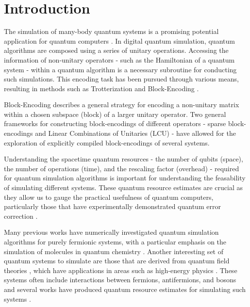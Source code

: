 \section{Introduction}
\label{sec:intro}

The simulation of many-body quantum systems is a promising potential application for quantum computers \cite{feynman2018simulating}.
In digital quantum simulation, quantum algorithms are composed using a series of unitary operations.
Accessing the information of non-unitary operators - such as the Hamiltonian of a quantum system - within a quantum algorithm is a necessary subroutine for conducting such simulations.
This encoding task has been pursued through various means, resulting in methods such as Trotterization \cite{suzuki1976generalized,hatano2005finding,lie1893theorie,trotter1959product,childs2021theory} and Block-Encoding \cite{lin2022lecture, poulin2018quantum, low2019hamiltonian}.

Block-Encoding describes a general strategy for encoding a non-unitary matrix within a chosen subspace (block) of a larger unitary operator.
Two general frameworks for constructing block-encodings of different operators - sparse block-encodings \cite{berry2009black, childs2009universal, lin2022lecture} and Linear Combinations of Unitaries (LCU) \cite{childs2012hamiltonian} - have allowed for the exploration of explicitly compiled block-encodings of several systems.

Understanding the spacetime quantum resources - the number of qubits (space), the number of operations (time), and the rescaling factor (overhead) - required for quantum simulation algorithms is important for understanding the feasability of simulating different systems.
These quantum resource estimates are crucial as they allow us to gauge the practical usefulness of quantum computers, particularly those that have experimentally demonstrated quantum error correction \cite{bluvstein2024logical, acharya2024quantum}.

Many previous works have numerically investigated quantum simulation algorithms for purely fermionic systems, with a particular emphasis on the simulation of molecules in quantum chemistry \cite{aspuru2005simulated, peruzzo2014variational, babbush2014adiabatic, o2016scalable, babbush2018encoding, google2020hartree, lee2021even, kivlichan2020improved, campbell2021early}.
Another interesting set of quantum systems to simulate are those that are derived from quantum field theories \cite{Peskin:1995ev, jordan2012quantum} , which have applications in areas such as high-energy physics \cite{bauer2023quantum}.
These systems often include interactions between fermions, antifermions, and bosons and several works have produced quantum resource estimates for simulating such systems \cite{camps2024explicit, liu2024efficient, rhodes2024exponential}.


